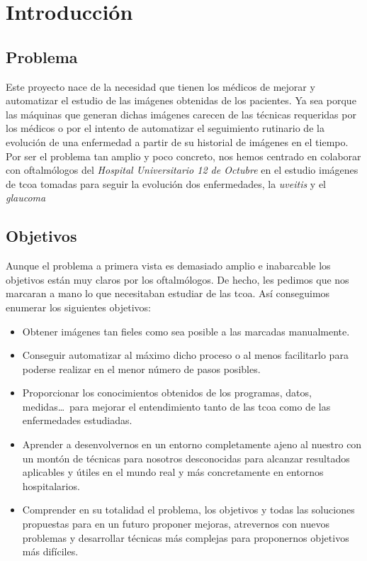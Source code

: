 \chapter{Introducción}
\section{Problema}
Este proyecto nace de la necesidad que tienen los médicos de mejorar y
automatizar el estudio de las imágenes obtenidas de los pacientes. Ya
sea porque las máquinas que generan dichas imágenes carecen de las
técnicas requeridas por los médicos o por el intento de automatizar el
seguimiento rutinario de la evolución de una enfermedad a partir de su
historial de imágenes en el tiempo. \\
Por ser el problema tan amplio y poco concreto, nos hemos centrado en
colaborar con oftalmólogos del \emph{Hospital Universitario 12 de
  Octubre} en el estudio imágenes de \gls{tcoa} tomadas para seguir la
evolución dos enfermedades, la \emph{uveitis} y el \emph{glaucoma}

\section{Objetivos}
Aunque el problema a primera vista es demasiado amplio e inabarcable
los objetivos están muy claros por los oftalmólogos. De hecho, les
pedimos que nos marcaran a mano lo que necesitaban estudiar de las
\gls{tcoa}. Así conseguimos enumerar los siguientes objetivos:
\begin{itemize}
\item Obtener imágenes tan fieles como sea posible a las marcadas
  manualmente.
\item Conseguir automatizar al máximo dicho proceso o al menos
  facilitarlo para poderse realizar en el menor número de pasos posibles.
\item Proporcionar los conocimientos obtenidos de los programas, datos,
  medidas\ldots\ para mejorar el entendimiento tanto de las \gls{tcoa}
  como de las enfermedades estudiadas.
\item Aprender a desenvolvernos en un entorno completamente ajeno al
  nuestro con un montón de técnicas para nosotros desconocidas para alcanzar
  resultados aplicables y útiles en el  mundo real y más concretamente
  en entornos hospitalarios.
\item Comprender en su totalidad el problema, los objetivos y todas
  las soluciones propuestas para en un futuro proponer mejoras,
  atrevernos con nuevos problemas y desarrollar técnicas más complejas
  para proponernos objetivos más difíciles.
\end{itemize}

